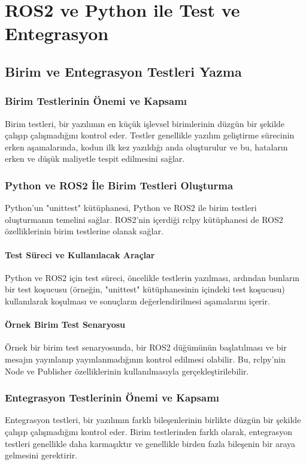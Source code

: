 \chapter{ROS2 ve Python ile Test ve Entegrasyon}

\section{Birim ve Entegrasyon Testleri Yazma}
\subsection{Birim Testlerinin Önemi ve Kapsamı}
Birim testleri, bir yazılımın en küçük işlevsel birimlerinin düzgün bir şekilde çalışıp çalışmadığını kontrol eder. Testler genellikle yazılım geliştirme sürecinin erken aşamalarında, kodun ilk kez yazıldığı anda oluşturulur ve bu, hataların erken ve düşük maliyetle tespit edilmesini sağlar.

\subsection{Python ve ROS2 İle Birim Testleri Oluşturma}
Python'un "unittest" kütüphanesi, Python ve ROS2 ile birim testleri oluşturmanın temelini sağlar. ROS2'nin içerdiği rclpy kütüphanesi de ROS2 özelliklerinin birim testlerine olanak sağlar.

\subsubsection{Test Süreci ve Kullanılacak Araçlar}
Python ve ROS2 için test süreci, öncelikle testlerin yazılması, ardından bunların bir test koşucusu (örneğin, "unittest" kütüphanesinin içindeki test koşucusu) kullanılarak koşulması ve sonuçların değerlendirilmesi aşamalarını içerir.

\subsubsection{Örnek Birim Test Senaryosu}
Örnek bir birim test senaryosunda, bir ROS2 düğümünün başlatılması ve bir mesajın yayınlanıp yayınlanmadığının kontrol edilmesi olabilir. Bu, rclpy'nin Node ve Publisher özelliklerinin kullanılmasıyla gerçekleştirilebilir.

\subsection{Entegrasyon Testlerinin Önemi ve Kapsamı}
Entegrasyon testleri, bir yazılımın farklı bileşenlerinin birlikte düzgün bir şekilde çalışıp çalışmadığını kontrol eder. Birim testlerinden farklı olarak, entegrasyon testleri genellikle daha karmaşıktır ve genellikle birden fazla bileşenin bir araya gelmesini gerektirir.

